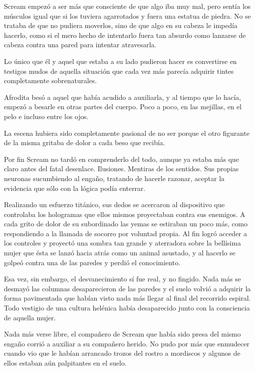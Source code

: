 Scream empezó a ser más que consciente de que algo iba muy mal, pero sentía los músculos igual que si los tuviera agarrotados y fuera una estatua de piedra. No se trataba de que no pudiera moverlos, sino de que algo en su cabeza le impedía hacerlo, como si el mero hecho de intentarlo fuera tan absurdo como lanzarse de cabeza contra una pared para intentar atravesarla.

Lo único que él y aquel que estaba a su lado pudieron hacer es convertirse en testigos mudos de aquella situación que cada vez más parecía adquirir tintes completamente sobrenaturales.

Afrodita besó a aquel que había acudido a auxiliarla, y al tiempo que lo hacía, empezó a besarle en otras partes del cuerpo. Poco a poco, en las mejillas, en el pelo e incluso entre los ojos.

La escena hubiera sido completamente pasional de no ser porque el otro figurante de la misma gritaba de dolor a cada beso que recibía.

Por fin Scream no tardó en comprenderlo del todo, aunque ya estaba más que claro antes del fatal desenlace. Ilusiones. Mentiras de los sentidos. Sus propias neuronas sucumbiendo al engaño, tratando de hacerle razonar, aceptar la evidencia que sólo con la lógica podía enterrar.

Realizando un esfuerzo titánico, sus dedos se acercaron al dispositivo que controlaba los hologramas que ellos mismos proyectaban contra sus enemigos. A cada grito de dolor de su subordinado las yemas se estiraban un poco más, como respondiendo a la llamada de socorro por voluntad propia. Al fin logró acceder a los controles y proyectó una sombra tan grande y aterradora sobre la bellísima mujer que ésta se lanzó hacia atrás como un animal asustado, y al hacerlo se golpeó contra una de las paredes y perdió el conocimiento.

Esa vez, sin embargo, el desvanecimiento sí fue real, y no fingido. Nada más se desmayó las columnas desaparecieron de las paredes y el suelo volvió a adquirir la forma pavimentada que habían visto nada más llegar al final del recorrido espiral. Todo vestigio de una cultura helénica había desaparecido junto con la consciencia de aquella mujer.

Nada más verse libre, el compañero de Scream que había sido presa del mismo engaño corrió a auxiliar a su compañero herido. No pudo por más que enmudecer cuando vio que le habían arrancado trozos del rostro a mordiscos y algunos de ellos estaban aún palpitantes en el suelo.

